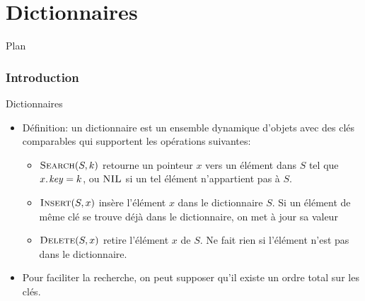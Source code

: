
\part{Dictionnaires}






\begin{frame}{Plan}

\tableofcontents[hideallsubsections]

\end{frame}

\section{Introduction}

\begin{frame}{Dictionnaires}
\begin{itemize}
\item Définition: un \alert{dictionnaire} est un ensemble dynamique
  d'objets avec des clés comparables qui supportent les opérations
  suivantes:
\begin{itemize}
\item $\textnormal{\scshape Search}(S,k)$ retourne un pointeur $x$ vers un élément dans $S$ tel que $\attrib{x}{key}=k$, ou $\textnormal{\scshape NIL}$ si un tel élément n'appartient pas à $S$.
\medskip
\item $\textnormal{\scshape Insert}(S,x)$ insère l'élément $x$ dans le dictionnaire $S$. Si un élément de même clé se trouve déjà dans le dictionnaire, on met à jour sa valeur
\medskip
\item $\textnormal{\scshape Delete}(S,x)$ retire l'élément $x$ de $S$. Ne fait rien si l'élément n'est pas dans le dictionnaire.
\end{itemize}
\medskip
\item Pour faciliter la recherche, on peut supposer qu'il existe un ordre total sur les clés.
\end{itemize}
\end{frame}

